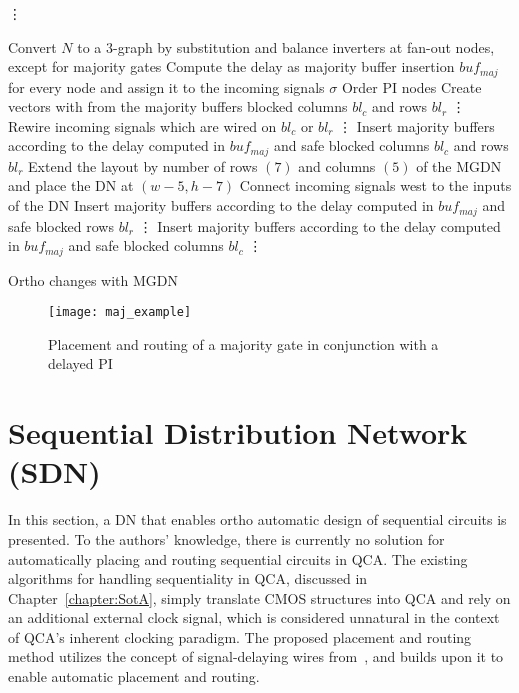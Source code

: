 \begin{algorithm}[H]
	\vdots
	
	\begin{algorithmic}
		\State Convert $N$ to a 3-graph by substitution and balance inverters at fan-out nodes, except for majority gates
		\State Compute the delay as majority buffer insertion $buf_{maj}$ for every node and assign it to the incoming signals $\sigma$
		\State Order PI nodes
		\State Create vectors with from the majority buffers blocked columns $bl_c$ and rows $bl_r$
		\State \vdots
		\State Rewire incoming signals which are wired on $bl_c$ or $bl_r$
		\State \vdots
		\EndIf
		\State Insert majority buffers according to the delay computed in $buf_{maj}$ and safe blocked columns $bl_c$ and rows $bl_r$
		\State Extend the layout by number of rows $(7)$ and columns $(5)$ of the MGDN and place the DN at $(w-5, h-7)$
		\State Connect incoming signals west to the inputs of the DN
		\State Insert majority buffers according to the delay computed in $buf_{maj}$ and safe blocked rows $bl_r$
		\State \vdots
		\State Insert majority buffers according to the delay computed in $buf_{maj}$ and safe blocked columns $bl_c$
		\State \vdots
		\EndIf
		
		\EndFor
	\end{algorithmic}
	\caption{Ortho changes with MGDN}\label{alg:majority_network}
\end{algorithm}

\begin{figure}
	\centering
	\texttt{[image: maj\_example]}
	\caption{Placement and routing of a majority gate in conjunction with a delayed PI}\label{fig:majority_with_buf}
\end{figure}


\section{Sequential Distribution Network (SDN)}
In this section, a DN that enables ortho automatic design of sequential circuits is presented. To the authors' knowledge, there is currently no solution for automatically placing and routing sequential circuits in QCA. The existing algorithms for handling sequentiality in QCA, discussed in Chapter~\ref{chapter:SotA}, simply translate CMOS structures into QCA and rely on an additional external clock signal, which is considered unnatural in the context of QCA's inherent clocking paradigm. The proposed placement and routing method utilizes the concept of signal-delaying wires from~\cite{Walter}, and builds upon it to enable automatic placement and routing.

